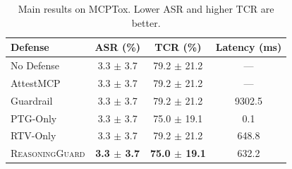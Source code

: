 \begin{table}[t]
\centering
\small
\begin{tabular}{lccc}
\toprule
Defense & ASR (\%) & TCR (\%) & Latency (ms) \\
\midrule
No Defense & 3.3 $\pm$ 3.7 & 79.2 $\pm$ 21.2 & --- \\
AttestMCP & 3.3 $\pm$ 3.7 & 79.2 $\pm$ 21.2 & --- \\
Guardrail & 3.3 $\pm$ 3.7 & 79.2 $\pm$ 21.2 & 9302.5 \\
PTG-Only & 3.3 $\pm$ 3.7 & 75.0 $\pm$ 19.1 & 0.1 \\
RTV-Only & 3.3 $\pm$ 3.7 & 79.2 $\pm$ 21.2 & 648.8 \\
\textsc{ReasoningGuard} & \textbf{3.3 $\pm$ 3.7} & \textbf{75.0 $\pm$ 19.1} & 632.2 \\
\bottomrule
\end{tabular}
\caption{Main results on MCPTox. Lower ASR and higher TCR are better.}
\label{tab:main}
\end{table}

